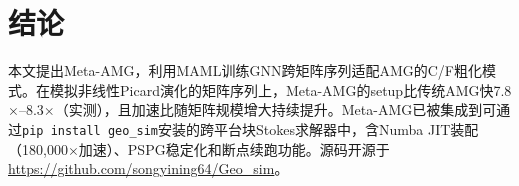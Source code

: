 \documentclass[11pt,a4paper]{ctexart}
\begin{document}
\section{结论}
\label{sec:conclusion}

本文提出Meta-AMG，利用MAML训练GNN跨矩阵序列适配AMG的C/F粗化模式。在模拟非线性Picard演化的矩阵序列上，Meta-AMG的setup比传统AMG快7.8$\times$--8.3$\times$（实测），且加速比随矩阵规模增大持续提升。Meta-AMG已被集成到可通过\texttt{pip install geo\_sim}安装的跨平台块Stokes求解器中，含Numba JIT装配（180,000$\times$加速）、PSPG稳定化和断点续跑功能。源码开源于\url{https://github.com/songyining64/Geo\_sim}。

\end{document}
